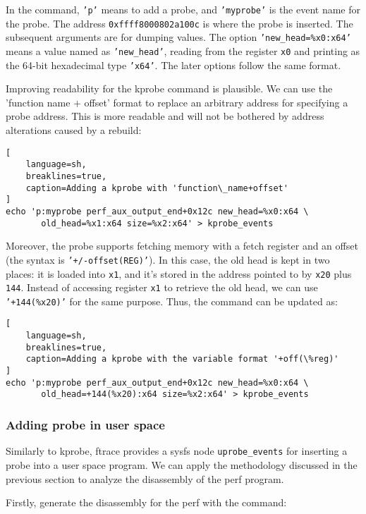\documentclass[11pt]{diazessay} %
\def\code#1{\texttt{#1}}
\begin{document}
In the command, \code{'p'} means to add a probe, and \code{'myprobe'} is the
event name for the probe. The address \code{0xffff8000802a100c} is where the
probe is inserted. The subsequent arguments are for dumping values. The option
\code{'new\_head=\%x0:x64'} means a value named as \code{'new\_head'}, reading
from the register \code{x0} and printing as the 64-bit hexadecimal type
\code{'x64'}. The later options follow the same format.

Improving readability for the kprobe command is plausible. We can use the
'function name + offset' format to replace an arbitrary address for
specifying a probe address. This is more readable and will not be bothered by
address alterations caused by a rebuild:

\begin{lstlisting}[
  	language=sh,
	breaklines=true,
	caption=Adding a kprobe with 'function\_name+offset'
]
echo 'p:myprobe perf_aux_output_end+0x12c new_head=%x0:x64 \
       old_head=%x1:x64 size=%x2:x64' > kprobe_events
\end{lstlisting}

Moreover, the probe supports fetching memory with a fetch register and an
offset (the syntax is \code{'+/-offset(REG)'}). In this case, the old head is
kept in two places: it is loaded into \code{x1}, and it's stored in the
address pointed to by \code{x20} plus \code{144}. Instead of accessing
register \code{x1} to retrieve the old head, we can use \code{'+144(\%x20)'}
for the same purpose. Thus, the command can be updated as:

\begin{lstlisting}[
  	language=sh,
	breaklines=true,
	caption=Adding a kprobe with the variable format '+off(\%reg)'
]
echo 'p:myprobe perf_aux_output_end+0x12c new_head=%x0:x64 \
       old_head=+144(%x20):x64 size=%x2:x64' > kprobe_events
\end{lstlisting}

\subsubsection*{Adding probe in user space}

Similarly to kprobe, ftrace provides a sysfs node \code{uprobe\_events} for
inserting a probe into a user space program. We can apply the methodology
discussed in the previous section to analyze the disassembly of the perf
program.

Firstly, generate the disassembly for the perf with the command:
\end{document}
